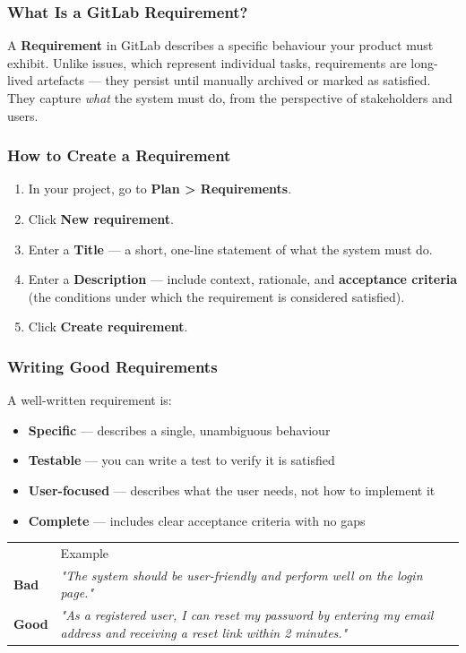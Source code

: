\documentclass[11pt,a4paper]{book}
\begin{document}
\subsubsection{What Is a GitLab Requirement?}

A \textbf{Requirement} in GitLab describes a specific behaviour your product must exhibit. Unlike issues, which represent individual tasks, requirements are long-lived artefacts --- they persist until manually archived or marked as satisfied. They capture \textit{what} the system must do, from the perspective of stakeholders and users.

\subsubsection{How to Create a Requirement}

\begin{enumerate}
  \item In your project, go to \textbf{Plan > Requirements}.
  \item Click \textbf{New requirement}.
  \item Enter a \textbf{Title} --- a short, one-line statement of what the system must do.
  \item Enter a \textbf{Description} --- include context, rationale, and \textbf{acceptance criteria} (the conditions under which the requirement is considered satisfied).
  \item Click \textbf{Create requirement}.
\end{enumerate}

\subsubsection{Writing Good Requirements}

A well-written requirement is:
\begin{itemize}
  \item \textbf{Specific} --- describes a single, unambiguous behaviour
  \item \textbf{Testable} --- you can write a test to verify it is satisfied
  \item \textbf{User-focused} --- describes what the user needs, not how to implement it
  \item \textbf{Complete} --- includes clear acceptance criteria with no gaps
\end{itemize}

\begin{tabular}{ll}
\hline
 & Example \\
\textbf{Bad} & \textit{"The system should be user-friendly and perform well on the login page."} \\
\textbf{Good} & \textit{"As a registered user, I can reset my password by entering my email address and receiving a reset link within 2 minutes."} \\
\hline
\end{tabular}
\end{document}
